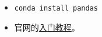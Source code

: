 
\begin{issues}
\issueDraft
\end{issues}

\begin{itemize}
\item \verb|conda install pandas|
\item 官网的\href{https://pandas.pydata.org/docs/getting_started/index.html}{入门教程}。
\end{itemize}

